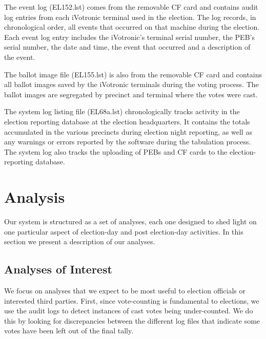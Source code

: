 \documentclass[letterpaper,twocolumn,10pt]{article}
\begin{document}
The event log (EL152.lst) comes from the removable CF card and contains audit
log entries from each iVotronic terminal used in the election. The log records,
in chronological order, all events that occurred on that machine during the
election. Each event log entry includes the iVotronic's terminal serial number,
the PEB's serial number, the date and time, the event that occurred and a
description of the event.

The ballot image file (EL155.lst) is also from the removable CF card and
contains all ballot images saved by the iVotronic terminals during the voting
process. The ballot images are segregated by precinct and terminal where the
votes were cast. 

The system log listing file (EL68a.lst) chronologically tracks activity in the
election reporting database at the election headquarters. It contains the totals
accumulated in the various precincts during election night reporting, as well as
any warnings or errors reported by the software during the tabulation
process. The system log also tracks the uploading of PEBs and CF cards to the
election-reporting database.

\section{Analysis}
Our system is structured as a set of analyses, each one designed to shed light
on one particular aspect of election-day and post election-day activities. In
this section we present a description of our analyses.

\subsection{Analyses of Interest}
We focus on analyses that we expect to be most useful to election officials or
interested third parties. First, since vote-counting is fundamental to
elections, we use the audit logs to detect instances of cast votes being
under-counted. We do this by looking for discrepancies between the
different log files that indicate some votes have been left out of the final
tally. 
\end{document}
